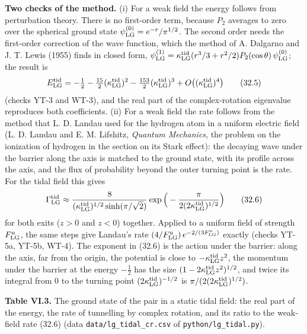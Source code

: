 \documentclass[
  10pt,
]{article}
\begin{document}
\textbf{Two checks of the method.} (i) For a weak field the energy
follows from perturbation theory. There is no first-order term, because
\(P_2\) averages to zero over the spherical ground state
\(\psi^{(0)}_{\rm LG}=e^{-r}/\pi^{1/2}\). The second order needs the
first-order correction of the wave function, which the method of A.
Dalgarno and J. T. Lewis (1955) finds in closed form,
\(\psi^{(1)}_{\rm LG}=\kappa^{\rm tid}_{\rm LG}(r^3/3+r^2/2)P_2(\cos\theta)\,\psi^{(0)}_{\rm LG}\);
the result is
\[E^{\rm tid}_{\rm LG}=-\tfrac12-\tfrac{15}2(\kappa^{\rm tid}_{\rm LG})^2-\tfrac{153}2(\kappa^{\rm tid}_{\rm LG})^3+O\big((\kappa^{\rm tid}_{\rm LG})^4\big)\tag{32.5}\]
(checks YT-3 and WT-3), and the real part of the complex-rotation
eigenvalue reproduces both coefficients. (ii) For a weak field the rate
follows from the method that L. D. Landau used for the hydrogen atom in
a uniform electric field (L. D. Landau and E. M. Lifshitz, \emph{Quantum
Mechanics}, the problem on the ionization of hydrogen in the section on
its Stark effect): the decaying wave under the barrier along the axis is
matched to the ground state, with its profile across the axis, and the
flux of probability beyond the outer turning point is the rate. For the
tidal field this gives
\[\Gamma^{\rm tid}_{\rm LG}\approx\frac8{(\kappa^{\rm tid}_{\rm LG})^{1/2}\sinh(\pi/\sqrt2)}\exp\Big(-\frac\pi{2(2\kappa^{\rm tid}_{\rm LG})^{1/2}}\Big)\tag{32.6}\]
for both exits (\(z>0\) and \(z<0\)) together. Applied to a uniform
field of strength \(F^{\rm u}_{\rm LG}\), the same steps give Landau's
rate \((4/F^{\rm u}_{\rm LG})\,e^{-2/(3F^{\rm u}_{\rm LG})}\) exactly
(checks YT-5a, YT-5b, WT-4). The exponent in (32.6) is the action under
the barrier: along the axis, far from the origin, the potential is close
to \(-\kappa^{\rm tid}_{\rm LG}z^2\), the momentum under the barrier at
the energy \(-\tfrac12\) has the size
\((1-2\kappa^{\rm tid}_{\rm LG}z^2)^{1/2}\), and twice its integral from
0 to the turning point \((2\kappa^{\rm tid}_{\rm LG})^{-1/2}\) is
\(\pi/(2(2\kappa^{\rm tid}_{\rm LG})^{1/2})\).

\textbf{Table VI.3.} The ground state of the pair in a static tidal
field: the real part of the energy, the rate of tunnelling by complex
rotation, and its ratio to the weak-field rate (32.6) (data
\texttt{data/lg\_tidal\_cr.csv} of \texttt{python/lg\_tidal.py}).
\end{document}
